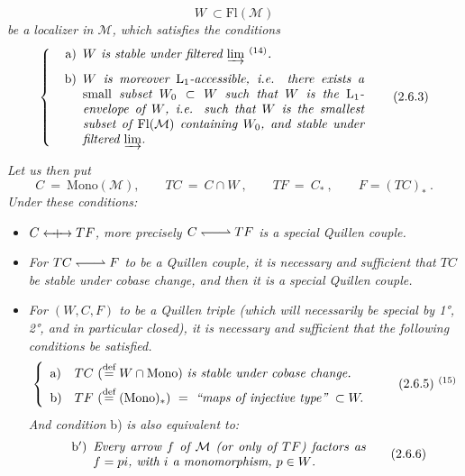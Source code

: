\documentclass[11pt]{article}
\newcommand{\printedpage}[1]{\marginpar{\footnotesize p.~#1}}
\newcommand{\msp}[1]{\marginpar{\footnotesize [#1]}}
\newcommand{\deq}{\overset{\text{def}}{=}}
\newcommand{\Mono}{\mathrm{Mono}}
\newcommand{\Fl}{\mathrm{Fl}}
\newcommand{\qpair}{\mathrel{\leftharpoondown\joinrel\relbar\joinrel\rightharpoonup}}
\newcommand{\Qcouple}{\mathrel{\leftarrow\mkern-9mu{+}\mkern-9mu\rightarrow}}
\begin{document}
\[ W \ \subset \Fl(\mathcal{M}) \tag*{(2.6.2)} \]
\textit{be a localizer in $\mathcal{M}$, which satisfies the conditions}
\[ \left\{ \begin{minipage}{0.72\textwidth}\itshape
\begin{itemize}[leftmargin=2.5em]
\item[\upshape a)] $W$ is stable under filtered $\varinjlim$ $^{\textup{(14)}}$.
\item[\upshape b)] $W$ is moreover $\mathrm{L}_1$-accessible, i.e. there exists a \textup{small} subset $W_0 \subset W$ such that $W$ is the $\mathrm{L}_1$-envelope of $W$, i.e. such that $W$ is the smallest subset of $\Fl(\mathcal{M})$ containing $W_0$, and stable under filtered $\varinjlim$. %
\end{itemize}
\end{minipage}\right. \tag*{(2.6.3)} \]

\printedpage{16}

\msp{page 26}
\textit{Let us then put}
\[ C \ = \ \Mono(\mathcal{M}), \qquad TC \ = \ C\cap W\ , \qquad TF \ = \ C_*\ , \qquad F = (TC)_*\ . \tag*{(2.6.4)} \]
\textit{Under these conditions:}
\begin{itemize}[leftmargin=2.5em]
\item[1°)] \textit{$C \Qcouple TF$, more precisely $C \qpair TF$ is a special Quillen couple.} %
\item[2°)] \textit{For $TC \qpair F$ to be a Quillen couple, it is necessary and sufficient that $TC$ be stable under cobase change, and then it is a special Quillen couple.} %
\item[3°)] \textit{For $(W,C,F)$ to be a Quillen triple (which will necessarily be special by \textup{1°, 2°}, and in particular closed), it is necessary and sufficient that the following conditions be satisfied.}
\[ \left\{ \begin{array}{ll}
\text{a)} & TC\ (\deq W\cap\Mono)\ \text{\itshape is stable under cobase change.}\\[1ex]
\text{b)} & TF\ (\deq (\Mono)_*) \ = \ \text{\itshape ``maps of injective type''}\ \subset W.
\end{array}\right. \tag*{(2.6.5)~$^{(15)}$} \]
\textit{And condition} b) \textit{is also equivalent to:}
\[ \begin{minipage}{0.7\textwidth}
\begin{itemize}[leftmargin=2.5em]
\item[b$'$)] \textit{Every arrow $f$ of $\mathcal{M}$ (or only of $TF$) factors as $f = pi$, with $i$ a monomorphism, $p \in W$.}
\end{itemize}
\end{minipage} \tag*{(2.6.6)} \]
\end{itemize}
\end{document}
